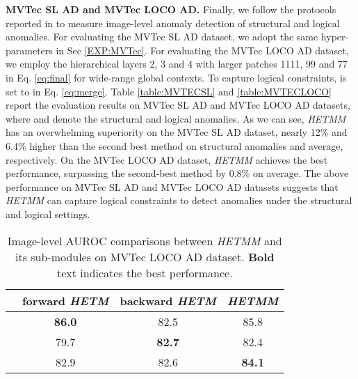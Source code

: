 \documentclass[default,iicol]{sn-jnl}\usepackage[algo2e,ruled,linesnumbered]{algorithm2e}
\theoremstyle{thmstyleone}\newtheorem{theorem}{Theorem}\newtheorem{proposition}[theorem]{Proposition}
\theoremstyle{thmstyletwo}\newtheorem{example}{Example}\newtheorem{remark}{Remark}
\theoremstyle{thmstylethree}\newtheorem{definition}{Definition}
\begin{document}
\noindent\textbf{MVTec SL AD and MVTec LOCO AD. }
Finally, we follow the protocols reported in \cite{MVTECLOCO} to measure image-level anomaly detection of structural and logical anomalies.
For evaluating the MVTec SL AD dataset, we adopt the same hyper-parameters in Sec \ref{EXP:MVTec}.
For evaluating the MVTec LOCO AD dataset, we employ the hierarchical layers 2, 3 and 4 with larger patches 1111, 99 and 77 in Eq. \ref{eq:final} for wide-range global contexts.
To capture logical constraints,  is set to  in Eq. \ref{eq:merge}.
Table \ref{table:MVTECSL} and \ref{table:MVTECLOCO} report the evaluation results on MVTec SL AD and MVTec LOCO AD datasets, where  and  denote the structural and logical anomalies.
As we can see, \textit{HETMM} has an overwhelming superiority on the MVTec SL AD dataset, nearly 12\% and 6.4\% higher than the second best method on structural anomalies and average, respectively.
On the MVTec LOCO AD dataset, \textit{HETMM} achieves the best performance, surpassing the second-best method by 0.8\% on average.
The above performance on MVTec SL AD and MVTec LOCO AD datasets suggests that \textit{HETMM} can capture logical constraints to detect anomalies under the structural and logical settings.


\begin{table}[!t]
    \caption{
        Image-level AUROC comparisons between \textit{HETMM} and its sub-modules on MVTec LOCO AD dataset. 
        \textbf{Bold} text indicates the best performance.
    }
    \centering
    \begin{tabular}{c|ccc}
    \hline
                  & forward \textit{HETM}  & backward \textit{HETM}    & \textit{HETMM} \\\hline
     & \textbf{86.0} & 82.5          & 85.8          \\
     & 79.7          & \textbf{82.7} & 82.4          \\
            & 82.9          & 82.6          & \textbf{84.1} \\\hline
    \end{tabular}
    \label{table:LOCO}
\end{table}
\end{document}
